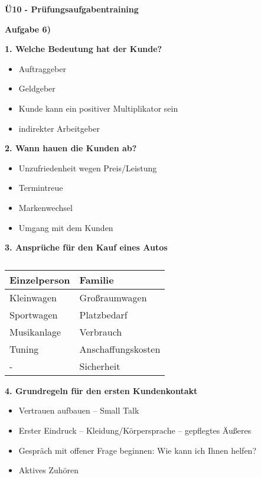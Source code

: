 \textbf{Ü10 - Prüfungsaufgabentraining}

\textbf{Aufgabe 6)}

\textbf{1. Welche Bedeutung hat der Kunde?}

\begin{itemize}
\item
  Auftraggeber
\item
  Geldgeber
\item
  Kunde kann ein positiver Multiplikator sein
\item
  indirekter Arbeitgeber
\end{itemize}

\textbf{2. Wann hauen die Kunden ab?}

\begin{itemize}
\item
  Unzufriedenheit wegen Preis/Leistung
\item
  Termintreue
\item
  Markenwechsel
\item
  Umgang mit dem Kunden
\end{itemize}

\textbf{3. Ansprüche für den Kauf eines Autos}

\begin{table}[!ht]%
\centering 
	\caption{}%
\begin{tabular}{@{}ll@{}}
\hline
\textbf{Einzelperson} & \textbf{Familie} \\
\hline
Kleinwagen & Großraumwagen \\
Sportwagen & Platzbedarf \\
Musikanlage & Verbrauch \\
Tuning & Anschaffungskosten \\
- & Sicherheit \\
\hline
\end{tabular} 
\end{table}

\textbf{4. Grundregeln für den ersten Kundenkontakt}

\begin{itemize}
\item
  Vertrauen aufbauen -- Small Talk
\item
  Erster Eindruck -- Kleidung/Körpersprache -- gepflegtes Äußeres
\item
  Gespräch mit offener Frage beginnen: Wie kann ich Ihnen helfen?
\item
  Aktives Zuhören
\end{itemize}

